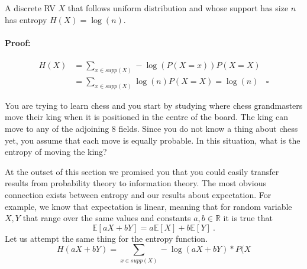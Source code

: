 \begin{Theorem}
A discrete RV $ X $ that follows uniform distribution and whose support has size $ n $ has entropy
$ H(X) = \log(n) $.
\end{Theorem}

\paragraph{Proof:}
\begin{align}
H(X) &= \underset{x \in supp(X)}{\sum}-\log(P(X=x))P(X=X) \\
&= \underset{x \in supp(X)}{\sum}\log(n)P(X=X) = \log(n)~~~~\square
\end{align}

\begin{Exercise}
You are trying to learn chess and you start by studying where chess grandmasters move their king when it
is positioned in the centre of the board. The king can move to any of the adjoining 8 fields. Since
you do not know a thing about chess yet, you assume that each move is equally probable. In this situation,
what is the entropy of moving the king?
\end{Exercise}

At the outset of this section we promised you that you could easily transfer results from probability 
theory to information theory. The most obvious connection exists between entropy and our results about
expectation. For example, we know that expectation is linear, meaning that for random variable $ X,Y $
that range over the same values and constants $ a,b \in \mathbb{R} $ it is true that
\begin{equation}
\mathbb{E}[aX+bY] = a\mathbb{E}[X] + b\mathbb{E}[Y] \ .
\end{equation}
Let us attempt the same thing for the entropy function.
\begin{equation}
H(aX + bY) = \underset{x \in supp(X)}{\sum} -\log(aX + bY)*P(X 
\end{equation}